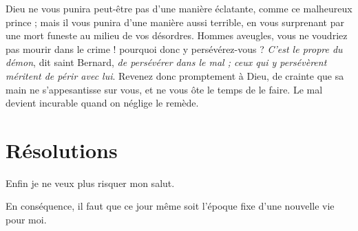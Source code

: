 \documentclass[instructions.tex]{subfiles}
\begin{document}
Dieu ne vous punira peut-être pas d'une manière éclatante, comme ce malheureux prince ; mais il vous punira d'une manière aussi terrible, en vous surprenant par une mort funeste au milieu de vos désordres. Hommes aveugles, vous ne voudriez pas mourir dans le crime ! pourquoi donc y persévérez-vous ? \emph{C'est le propre du démon}, dit saint Bernard, \emph{de persévérer dans le mal ; ceux qui y persévèrent méritent de périr avec lui}. Revenez donc promptement à Dieu, de crainte que sa main ne s'appesantisse sur vous, et ne vous ôte le temps de le faire. Le mal devient incurable quand on néglige le remède.


\section{Résolutions}

\primo Enfin je ne veux plus risquer mon salut.

\secundo En conséquence, il faut que ce jour même soit l'époque fixe d'une nouvelle vie pour moi. 

\end{document}
